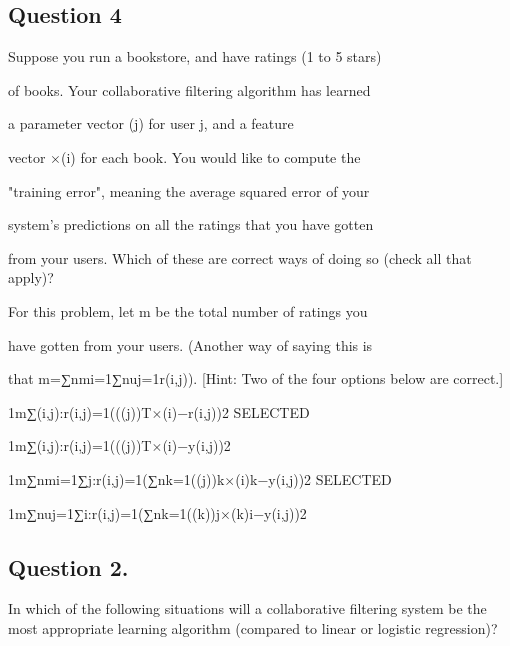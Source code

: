 \documentclass[11pt]{article} %
\begin{document}

\subsection*{Question 4 }  
Suppose you run a bookstore, and have ratings (1 to 5 stars)

of books. Your collaborative filtering algorithm has learned

a parameter vector \theta(j) for user j, and a feature

vector $ \times $(i) for each book. You would like to compute the

"training error", meaning the average squared error of your

system's predictions on all the ratings that you have gotten

from your users. Which of these are correct ways of doing so (check all that apply)?

For this problem, let m be the total number of ratings you

have gotten from your users. (Another way of saying this is

that m=∑nmi=1∑nuj=1r(i,j)). [Hint: Two of the four options below are correct.]


1m∑(i,j):r(i,j)=1((\theta(j))T$ \times $(i)−r(i,j))2 SELECTED

1m∑(i,j):r(i,j)=1((\theta(j))T$ \times $(i)−y(i,j))2

1m∑nmi=1∑j:r(i,j)=1(∑nk=1(\theta(j))k$ \times $(i)k−y(i,j))2 SELECTED

1m∑nuj=1∑i:r(i,j)=1(∑nk=1(\theta(k))j$ \times $(k)i−y(i,j))2


\subsection*{Question 2. } 

In which of the following situations will a collaborative filtering system be the most appropriate learning algorithm (compared to linear or logistic regression)?
\end{document}

